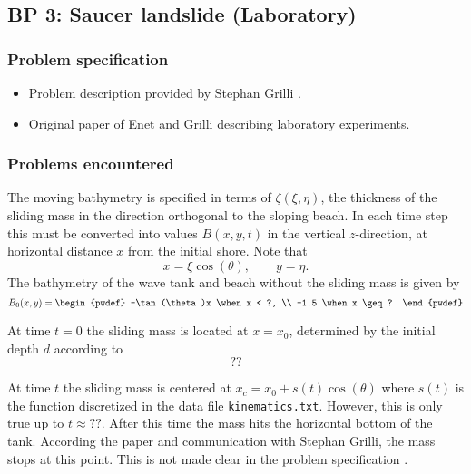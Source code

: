 \newsection
\subsection{BP 3:    
 Saucer landslide (Laboratory)}

\subsubsection{Problem specification}

\begin{itemize}


\item Problem description provided by Stephan Grilli
      \cite{bp3description}.  %

\item Original paper of Enet and Grilli \cite{EnetGrilli}
describing laboratory experiments.

\end{itemize} 

\subsubsection{Problems encountered}

The moving bathymetry is specified in terms of $\zeta(\xi,\eta)$,
the thickness of the sliding mass 
in the direction orthogonal to the sloping beach.  In each time step this must
be converted into values $B(x,y,t)$ in the vertical $z$-direction, 
at horizontal distance $x$ from the initial shore.  Note that
\[
x = \xi \cos(\theta), \qquad y = \eta.
\]
The bathymetry of the wave tank and beach without the sliding mass is given by
\[
B_0(x,y) = \begin{pwdef} 
  -\tan(\theta)x \when x < ?, \\
  -1.5 \when x \geq ? \end{pwdef}
\]

At time $t=0$ the sliding mass is located at $x=x_0$, determined by the
initial depth $d$ according to
\[
??
\]

At time $t$ the sliding mass is centered at $x_c = x_0 + s(t)\cos(\theta)$
where $s(t)$ is the function discretized in the data file
{\tt kinematics.txt}.    However, this is only true up to $t\approx ??$.  After
this time the mass hits the horizontal bottom of the tank.  According the
paper \cite{??} and communication with Stephan Grilli, the mass stops at
this point.  This is not made clear in the problem specification 
\cite{bp3description}.


